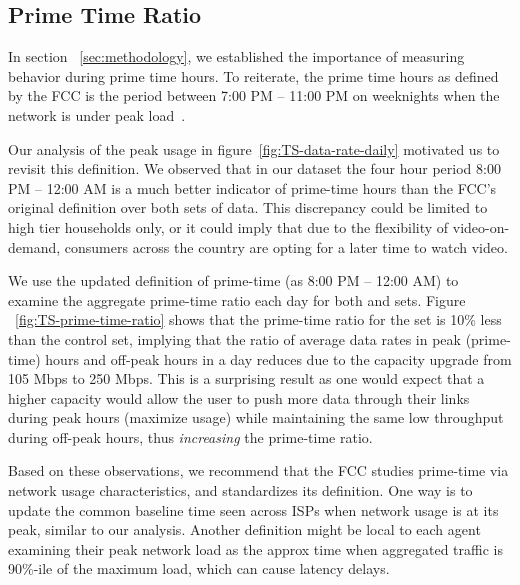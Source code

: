 \subsection{Prime Time Ratio}
\label{subsec:prime-time}


In section ~\ref{sec:methodology}, we established the importance of measuring behavior during prime time hours. To reiterate, the prime time hours as defined by the FCC is the period between 7:00 PM -- 11:00 PM on weeknights when the network is under peak load~\cite{fcc2014measuring-broadband}. 

Our analysis of the peak usage in figure~\ref{fig:TS-data-rate-daily} motivated us to revisit this definition. We observed that in our dataset the four hour period 8:00 PM -- 12:00 AM is a much better indicator of prime-time hours than the FCC's original definition over both sets of data. This discrepancy could be limited to high tier households only, or it could imply that due to the flexibility of video-on-demand, consumers across the country are opting for a later time to watch video. 

We use the updated definition of prime-time (as 8:00 PM -- 12:00 AM) to examine the aggregate prime-time ratio each day for both \test and \control sets. Figure ~\ref{fig:TS-prime-time-ratio} shows that the prime-time ratio for the \test set is 10\% less than the control set, implying that the ratio of average data rates in peak (prime-time) hours and off-peak hours in a day reduces due to the capacity upgrade from 105 Mbps to 250 Mbps. This is a surprising result as one would expect that a higher capacity would allow the user to push more data through their links during peak hours (maximize usage) while maintaining the same low throughput during off-peak hours, thus \emph{increasing} the prime-time ratio.

Based on these observations, we recommend that the FCC studies prime-time via network usage characteristics, and standardizes its definition. One way is to update the common baseline time seen across ISPs when network usage is at its peak, similar to our analysis. Another definition might be local to each agent examining their peak network load as the approx time when aggregated traffic is 90\%-ile of the maximum load, which can cause latency delays. 

